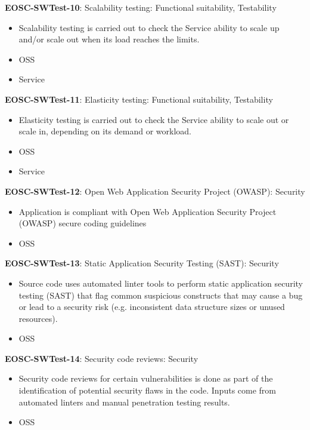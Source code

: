 \textbf{EOSC-SWTest-10}: Scalability testing: Functional suitability, Testability

\begin{itemize}
    \item Scalability testing is carried out to check the Service ability to scale up and/or scale out when its load reaches the limits. \cite{orviz_fernandez_eosc-synergy_2020}
    \item OSS
    \item Service
\end{itemize}

\textbf{EOSC-SWTest-11}: Elasticity testing: Functional suitability, Testability

\begin{itemize}
    \item Elasticity testing is carried out to check the Service ability to scale out or scale in, depending on its demand or workload. \cite{orviz_fernandez_eosc-synergy_2020}
    \item OSS
    \item Service
\end{itemize}

\textbf{EOSC-SWTest-12}: Open Web Application Security Project (OWASP): Security

\begin{itemize}
    \item Application is compliant with Open Web Application Security Project (OWASP) secure coding guidelines \cite{orviz_set_2017}
    \item OSS
\end{itemize}

\textbf{EOSC-SWTest-13}: Static Application Security Testing (SAST): Security

\begin{itemize}
    \item Source code uses automated linter tools to perform static application security testing (SAST) that flag common suspicious constructs that may cause a bug or lead to a security risk (e.g. inconsistent data structure sizes or unused resources). \cite{orviz_set_2017}
    \item OSS
\end{itemize}

\textbf{EOSC-SWTest-14}: Security code reviews: Security

\begin{itemize}
    \item Security code reviews for certain vulnerabilities is done as part of the identification of potential security flaws in the code. Inputs  come from automated linters and manual penetration testing results. \cite{gillies_modelling_1992,shepherdson_cessda_2019,orviz_set_2017}
    \item OSS
\end{itemize}

